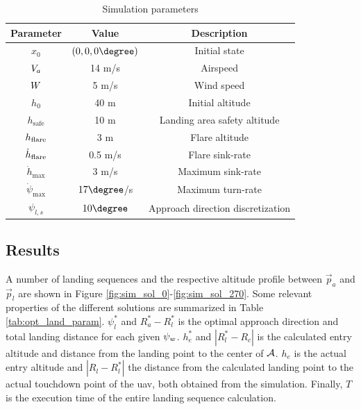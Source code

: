\begin{table}
    \begin{center}
        \begin{tabular}{|c|c|c|}
            \hline
            \textbf{Parameter} & \textbf{Value} & \textbf{Description}\\
            \hline
            $x_0$ & $(0,0,0\degree)$ & Initial state \\
            \hline
            $V_a$ & 14 m/s & Airspeed \\
            \hline
            $W$ & 5 m/s & Wind speed \\
            \hline
            $h_0$ & 40 m & Initial altitude \\
            \hline
            $h_{\text{safe}}$ & 10 m & Landing area safety altitude \\
            \hline
            $h_{\text{flare}}$ & 3 m & Flare altitude \\
            \hline
            $\dot{h}_{\text{flare}}$ & 0.5 m/s & Flare sink-rate\\
            \hline
            $\dot{h}_{\text{max}}$ & 3 m/s & Maximum sink-rate \\
            \hline
            $\dot{\psi}_{\text{max}}$ & $17\degree$/s & Maximum turn-rate\\
            \hline
            $\psi_{l,s}$ & $10\degree$ & Approach direction discretization \\
            \hline
        \end{tabular}        
    \end{center}
    \caption{Simulation parameters}
    \label{tab:sim_params}
\end{table}

\subsection{Results}
A number of landing sequences and the respective altitude profile between $\vec{p}_a$ and $\vec{p}_l$ are shown in Figure \ref{fig:sim_sol_0}-\ref{fig:sim_sol_270}.
Some relevant properties of the different solutions are summarized in Table \ref{tab:opt_land_param}. $\psi_l^*$ and $R_a^*-R_l^*$ is the optimal approach direction and total landing distance for each given $\psi_w$. $h_e^*$ and $|R_l^*-R_c|$ is the calculated entry altitude and distance from the landing point to the center of $\mathcal{A}$. 
$h_e$ is the actual entry altitude and $|R_l-R_l^*|$ the distance from the calculated landing point to the actual touchdown point of the \ac{uav}, both obtained from the simulation. Finally, $T$ is the
execution time of the entire landing sequence calculation.

